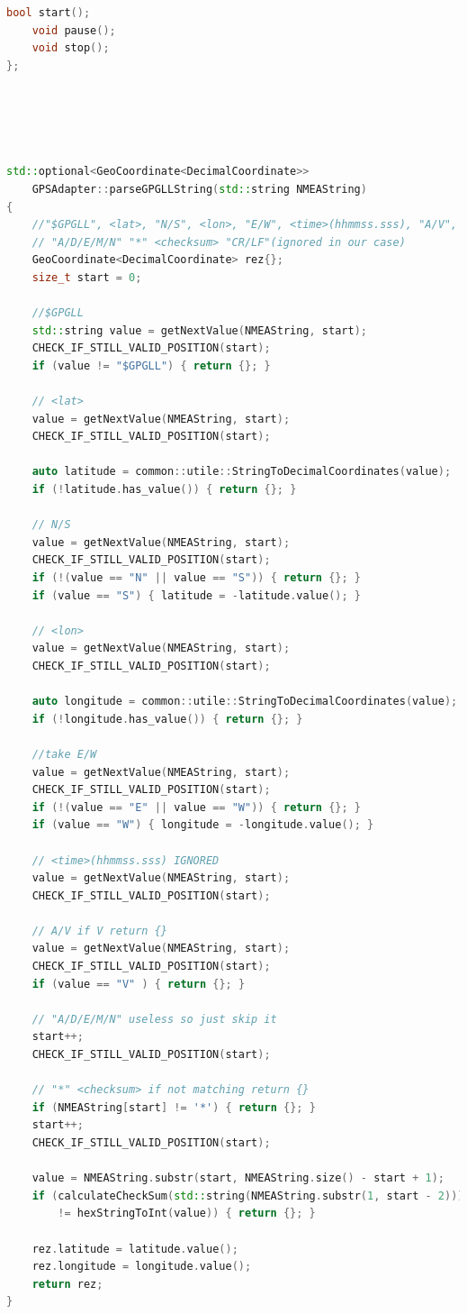 \documentclass[17pt]{article}
\begin{document}
\begin{lstlisting}[language = C++]
	bool start();
	void pause();
	void stop();
};





std::optional<GeoCoordinate<DecimalCoordinate>> 
    GPSAdapter::parseGPGLLString(std::string NMEAString)
{
	//"$GPGLL", <lat>, "N/S", <lon>, "E/W", <time>(hhmmss.sss), "A/V",
    // "A/D/E/M/N" "*" <checksum> "CR/LF"(ignored in our case)
	GeoCoordinate<DecimalCoordinate> rez{};
	size_t start = 0;

	//$GPGLL
	std::string value = getNextValue(NMEAString, start);
	CHECK_IF_STILL_VALID_POSITION(start);
	if (value != "$GPGLL") { return {}; }

	// <lat>
	value = getNextValue(NMEAString, start);
	CHECK_IF_STILL_VALID_POSITION(start);

	auto latitude = common::utile::StringToDecimalCoordinates(value);
	if (!latitude.has_value()) { return {}; }

	// N/S
	value = getNextValue(NMEAString, start);
	CHECK_IF_STILL_VALID_POSITION(start);
	if (!(value == "N" || value == "S")) { return {}; }
	if (value == "S") { latitude = -latitude.value(); }

	// <lon>
	value = getNextValue(NMEAString, start);
	CHECK_IF_STILL_VALID_POSITION(start);

	auto longitude = common::utile::StringToDecimalCoordinates(value);
	if (!longitude.has_value()) { return {}; }

	//take E/W
	value = getNextValue(NMEAString, start);
	CHECK_IF_STILL_VALID_POSITION(start);
	if (!(value == "E" || value == "W")) { return {}; }
	if (value == "W") { longitude = -longitude.value(); }

	// <time>(hhmmss.sss) IGNORED
	value = getNextValue(NMEAString, start);
	CHECK_IF_STILL_VALID_POSITION(start);

	// A/V if V return {}
	value = getNextValue(NMEAString, start);
	CHECK_IF_STILL_VALID_POSITION(start);
	if (value == "V" ) { return {}; }

	// "A/D/E/M/N" useless so just skip it
	start++;
	CHECK_IF_STILL_VALID_POSITION(start);

	// "*" <checksum> if not matching return {}
	if (NMEAString[start] != '*') { return {}; }
	start++;
	CHECK_IF_STILL_VALID_POSITION(start);

	value = NMEAString.substr(start, NMEAString.size() - start + 1);
	if (calculateCheckSum(std::string(NMEAString.substr(1, start - 2)))
        != hexStringToInt(value)) { return {}; }

	rez.latitude = latitude.value();
	rez.longitude = longitude.value();
	return rez;
}
\end{lstlisting}
\pagebreak
\end{document}
